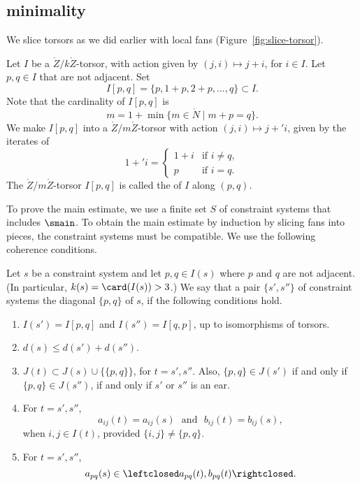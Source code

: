 \subsection{minimality}


We slice torsors as we did earlier with local fans 
(Figure~\ref{fig:slice-torsor}).



\begin{definition}[slice] 
Let $I$ be a $\ring{Z}/k\ring{Z}$-torsor, with action given by $(j,i)\mapsto j+i$,
for $i\in I$.  Let $p,q\in I$ that are not adjacent.  Set
\[
I[p,q] = \{p,1+p,2+p,\ldots,q\} \subset I.
\]
Note that the cardinality of $I[p,q]$ is
\[
m = 1 + \min \{m\in \ring{N} \mid m + p = q\}.
\]
We make $I[p,q]$ into a $\ring{Z}/m\ring{Z}$-torsor with action $(j,i)\mapsto j+' i$,
given by the iterates of
\[
1 +' i = 
\begin{cases}
  1 + i &\text{if } i\ne q,\\
  p &\text{if } i = q.
\end{cases}
\]
The $\ring{Z}/m\ring{Z}$-torsor $I[p,q]$ is called the
 of $I$ along $(p,q)$.
%
\end{definition}

\figWKUYEXM %


To prove the main estimate, we  use a finite set $S$ of constraint
systems that includes $\smain$.  To obtain the main estimate by
induction by slicing fans into pieces, the constraint systems must be
compatible. We use the following coherence conditions.

\begin{definition}
  Let $s$ be a constraint system and let $p,q\in I(s)$ where $p$ and
  $q$ are not adjacent.  (In particular, $k(s)=\card(I(s))>3$.)  We
  say that a pair $\{s',s''\}$ of constraint systems   the
  diagonal $\{p,q\}$ of $s$, if the following conditions hold.
\begin{enumerate}
\item  
 $I(s') = I[p,q]$ and $I(s'')=I[q,p]$, up to isomorphisms of torsors.
\item $d(s) \le d(s') + d(s'')$.
\item 
$J(t)\subset J(s)\cup \{\{p,q\}\}$, for  $t=s',s''$.
Also, $\{p,q\}\in J(s')$ if and only if $\{p,q\}\in J(s'')$,
 if and only if
 $s'$ or $s''$ is an ear.
\item For $t=s',s''$,
\[
a _{ij}(t) = a_{ij}(s)\text{~~and~~} b_{ij}(t) = b_{ij}(s),
\]
when $i,j\in I(t)$, provided $\{i,j\}\ne \{p,q\}$.
\item For $t=s',s''$,
\[
a_{pq}(s) \in \leftclosed a_{pq}(t),b_{pq}(t)\rightclosed.
\]
%
\end{enumerate}
\end{definition}
%

